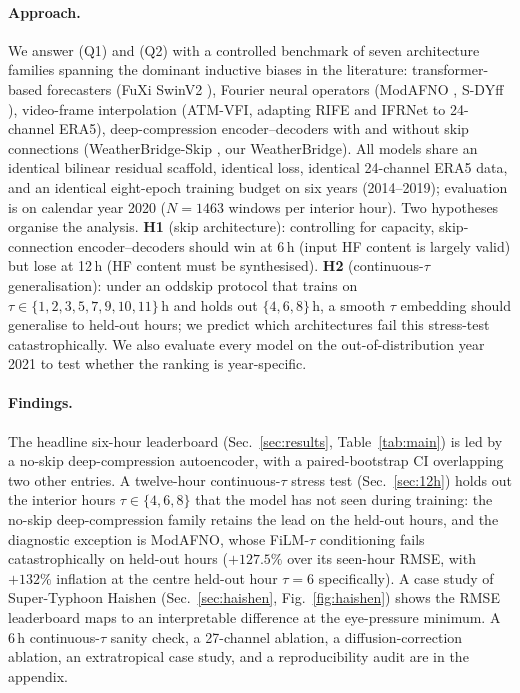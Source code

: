 \documentclass[10pt,letterpaper,twocolumn]{article}
\begin{document}
\paragraph{Approach.}
We answer (Q1) and (Q2) with a controlled benchmark of seven architecture
families spanning the dominant inductive biases in the literature:
transformer-based forecasters (FuXi SwinV2 \cite{chen2023fuxi,liu2022swinv2}),
Fourier neural operators (ModAFNO \cite{leinonen2024modafno},
S-DYff \cite{cachay2023dyffusion,bonev2023sfno}), video-frame
interpolation (ATM-VFI, adapting RIFE \cite{huang2022rife} and IFRNet
\cite{kong2022ifrnet} to 24-channel ERA5), deep-compression
encoder--decoders with and without skip connections (WeatherBridge-Skip
\cite{xie2024dcae,cai2024dcae}, our WeatherBridge). All models share an identical bilinear
residual scaffold, identical loss, identical 24-channel ERA5 data, and
an identical eight-epoch training budget on six years (2014--2019);
evaluation is on calendar year 2020 ($N{=}1463$ windows per interior
hour). Two hypotheses organise the analysis. \textbf{H1} (skip
architecture): controlling for capacity, skip-connection encoder--decoders
should win at 6\,h (input HF content is largely valid) but lose at 12\,h
(HF content must be synthesised). \textbf{H2} (continuous-$\tau$
generalisation): under an oddskip protocol that trains on
$\tau \in \{1,2,3,5,7,9,10,11\}$\,h and holds out $\{4,6,8\}$\,h, a
smooth $\tau$ embedding should generalise to held-out hours; we predict
which architectures fail this stress-test catastrophically.
We also evaluate every model on the out-of-distribution year 2021 to
test whether the ranking is year-specific.

\paragraph{Findings.}
The headline six-hour leaderboard
(Sec.~\ref{sec:results}, Table~\ref{tab:main}) is led by a no-skip
deep-compression autoencoder, with a paired-bootstrap CI overlapping
two other entries. A twelve-hour continuous-$\tau$ stress test
(Sec.~\ref{sec:12h}) holds
out the interior hours $\tau \in \{4, 6, 8\}$ that the model has not
seen during training: the no-skip deep-compression family retains the
lead on the held-out hours, and the diagnostic exception is ModAFNO,
whose FiLM-$\tau$ conditioning fails catastrophically on held-out hours
($+127.5\%$ over its seen-hour RMSE, with $+132\%$ inflation at the
centre held-out hour $\tau{=}6$ specifically). A case study of
Super-Typhoon Haishen (Sec.~\ref{sec:haishen}, Fig.~\ref{fig:haishen})
shows the RMSE leaderboard maps to an interpretable difference at the
eye-pressure minimum. A 6\,h continuous-$\tau$ sanity check, a
27-channel ablation, a diffusion-correction ablation, an extratropical
case study, and a reproducibility audit are in the appendix.
\end{document}

